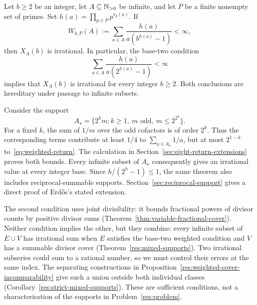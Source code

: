 \documentclass[11pt]{article}
\begin{document}
\begin{theorem}
\label{res:weighted-support}
Let $b\ge2$ be an integer, let $A\subseteq\mathbb{N}_{>0}$ be infinite, and let $P$
be a finite nonempty set of primes.  Set
$h(a)=\prod_{p\in P}p^{v_p(a)}$.  If
\begin{equation}\label{eq:weighted-fixed-base}
 W_{b,P}(A):=\sum_{a\in A}
 \frac{h(a)}{a(b^{h(a)}-1)}<\infty,
\end{equation}
then $X_A(b)$ is irrational.  In particular, the base-two condition
\begin{equation*}\label{eq:weighted-return}
 \sum_{a\in A}\frac{h(a)}{a(2^{h(a)}-1)}<\infty
 \tag{W}
\end{equation*}
implies that $X_A(b)$ is irrational for every integer $b\ge2$.  Both
conclusions are hereditary under passage to infinite subsets.
\end{theorem}

Consider the support
\[
 A_\star=\{2^km:k\ge1,\ m\text{ odd},\ m\le2^{2^k}\}.
\]
For a fixed $k$, the sum of $1/m$ over the odd cofactors is of order
$2^k$. Thus the corresponding terms contribute at least $1/4$ to
$\sum_{a\in A_\star}1/a$, but at most $2^{1-k}$
to~\eqref{eq:weighted-return}.
The calculation in Section~\ref{sec:eight-return-extensions} proves both
bounds. Every infinite subset of $A_\star$ consequently gives an
irrational value at every integer base. Since $h/(2^h-1)\le1$, the same
theorem also includes reciprocal-summable supports. Section~\ref{sec:reciprocal-support}
gives a direct proof of Erd\H{o}s's stated extension.

The second condition uses joint divisibility: it bounds fractional
powers of divisor counts by positive divisor sums
(Theorem~\ref{thm:variable-fractional-cover}). Neither condition implies
the other, but they combine: every infinite subset of $E\cup V$ has
irrational sum when $E$ satisfies the base-two weighted condition and
$V$ has a summable divisor cover (Theorem~\ref{res:mixed-supports}).
Two irrational subseries could sum to a rational number, so we must
control their errors at the same index. The separating constructions
in Proposition~\ref{res:weighted-cover-incomparability} give such a union
outside both individual classes (Corollary~\ref{res:strict-mixed-supports}).
These are sufficient conditions, not a characterisation of the supports
in Problem~\ref{res:problem}.
\end{document}
